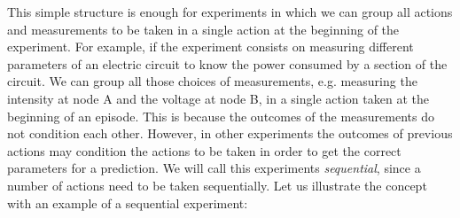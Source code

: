 \documentclass[11pt,a4paper,twoside]{report}
\newcommand{\+}{\textnormal{+} }
\theoremstyle{definition}
\numberwithin{equation}{chapter}
\begin{document}
This simple structure is enough for experiments in which we can group all
actions and measurements to be taken in a single action at the beginning of the
experiment. For example, if the experiment consists on measuring different
parameters of an electric circuit to know the power consumed by a section of the
circuit. We can group all those choices of measurements, e.g. measuring the
intensity at node A and the voltage at node B, in a single action taken at the
beginning of an episode. This is because the outcomes of the measurements do not
condition each other. However, in other experiments the outcomes of previous
actions may condition the actions to be taken in order to get the correct
parameters for a prediction. We will call this experiments \textit{sequential}, 
since a number of actions need to be taken sequentially.
Let us illustrate the concept with an example of a sequential experiment:
\end{document}
